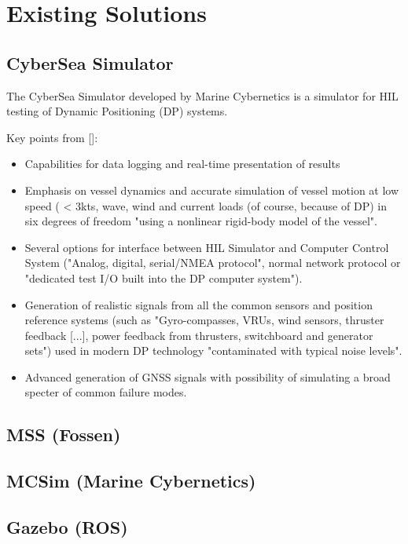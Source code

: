 \chapter{Existing Solutions}


\section{CyberSea Simulator}
The CyberSea Simulator developed by Marine Cybernetics is a simulator for HIL testing of Dynamic Positioning (DP) systems.

Key points from [\cite{HILtestingDP}]:
\begin{itemize}
\item Capabilities for data logging and real-time presentation of results
\item Emphasis on vessel dynamics and accurate simulation of vessel motion at low speed ( < 3kts, wave, wind and current loads (of course, because of DP) in six degrees of freedom "using a nonlinear rigid-body model of the vessel".
\item Several options for interface between HIL Simulator and Computer Control System ("Analog, digital, serial/NMEA protocol", normal network protocol or "dedicated test I/O built into the DP computer system").
\item Generation of realistic signals from all the common sensors and position reference systems (such as "Gyro-compasses, VRUs, wind sensors, thruster feedback [...], power feedback from thrusters, switchboard and generator sets") used in modern DP technology "contaminated with typical noise levels".
\item Advanced generation of GNSS signals with possibility of simulating a broad specter of common failure modes.
\end{itemize}


\section{MSS (Fossen)}

\section{MCSim (Marine Cybernetics)}

\section{Gazebo (ROS)}